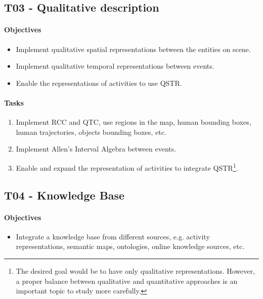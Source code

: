 \subsection*{T03 - Qualitative description}
\paragraph{Objectives}
\begin{itemize}
\item Implement qualitative spatial representations between the entities on scene.
\item Implement qualitative temporal representations between events.
\item Enable the representations of activities to use QSTR.
\end{itemize}
\paragraph{Tasks}
\begin{enumerate}[label= T03-\Alph*:]
\item Implement RCC and QTC, use regions in the map, human bounding boxes, human trajectories, objects bounding boxes, etc.
\item Implement Allen's Interval Algebra between events. 
\item Enable and expand the representation of activities to integrate QSTR\footnote{The desired goal would be to have only qualitative representations. However, a proper balance between qualitative and quantitative approaches is an important topic to study more carefully.}.
\end{enumerate}

\subsection*{T04 - Knowledge Base}
\paragraph{Objectives}
\begin{itemize}
\item Integrate a knowledge base from different sources, e.g. activity representations, semantic maps, ontologies, online knowledge sources, etc.
\end{itemize}
